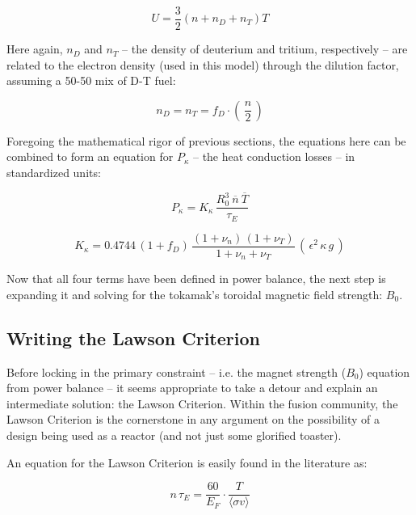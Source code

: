 \begin{equation}
	U = \frac{3}{2} \left( n + n_D + n_T \right) T
\end{equation}

Here again, $n_D$ and $n_T$ -- the density of deuterium and tritium, respectively -- are related to the electron density (used in this model) through the dilution factor, assuming a 50-50 mix of D-T fuel:

\begin{equation}
	n_D = n_T = f_D \cdot \left( \, \frac{n}{2} \, \right)
\end{equation}

Foregoing the mathematical rigor of previous sections, the equations here can be combined to form an equation for $P_\kappa$ -- the heat conduction losses -- in standardized units:

\begin{equation}
	\label{eq:pkappa}
	P_\kappa = K_\kappa \, \frac{ R_0 ^ 3 \ \overline{n}  \ \overline{T}  }{\tau_E} 
\end{equation}

\begin{equation}
	K_\kappa = 0.4744 \, ( 1 + f_D ) \, \frac{ (1 + \nu_n) \, (1 + \nu_T) }{1 + \nu_n + \nu_T } \, ( \, \epsilon^2 \, \kappa \, g \, )
\end{equation}

Now that all four terms have been defined in power balance, the next step is expanding it and solving for the tokamak's toroidal magnetic field strength: $B_0$.

\subsection{Writing the Lawson Criterion}

Before locking in the primary constraint -- i.e. the magnet strength ($B_0$) equation from power balance -- it seems appropriate to take a detour and explain an intermediate solution: the Lawson Criterion. Within the fusion community, the Lawson Criterion is the cornerstone in any argument on the possibility of a design being used as a reactor (and not just some glorified toaster). 

An equation for the Lawson Criterion is easily found in the literature as:

\begin{equation}
	\label{eq:lawson}
	n \, \tau_E = \frac{ 60 }{ E_F } \cdot \frac{ T }{ \langle \sigma v \rangle }
\end{equation}

